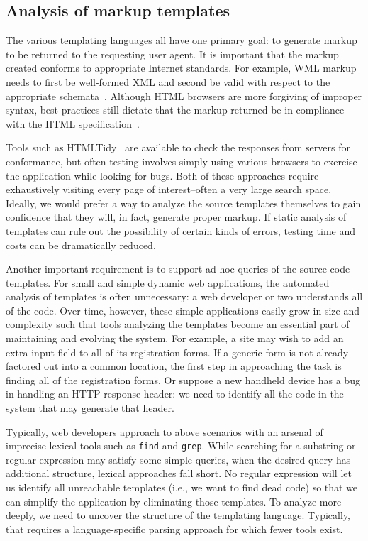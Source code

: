 \documentclass{www2003-submission}
\newcommand{\smtexttt}[1]{{\small\texttt{#1}}}
\begin{document}
\subsection{Analysis of markup templates}

The various templating languages all have one primary goal: to
generate markup to be returned to the requesting user agent.  It is
important that the markup created conforms to appropriate Internet
standards.  For example, WML markup needs to first be well-formed XML
and second be valid with respect to the appropriate
schemata~\cite{WML}.  Although HTML browsers are more forgiving of
improper syntax, best-practices still dictate that the markup returned
be in compliance with the HTML specification~\cite{HTML}.  

Tools such as HTMLTidy~\cite{HTMLTidy} are available to check the
responses from servers for conformance, but often testing involves
simply using various browsers to exercise the application while
looking for bugs.  Both of these approaches require exhaustively
visiting every page of interest--often a very large search space.
Ideally, we would prefer a way to analyze the source templates
themselves to gain confidence that they will, in fact, generate proper
markup.  If static analysis of templates can rule out the possibility
of certain kinds of errors, testing time and costs can be dramatically
reduced.

Another important requirement is to support ad-hoc queries of
the source code templates. For small and simple dynamic web applications,
the automated analysis of templates is often unnecessary: a web
developer or two understands all of the code.  Over time, however,
these simple applications easily grow in size and complexity such that
tools analyzing the templates become an essential part of maintaining
and evolving the system. For example, a site may wish to add an extra
input field to all of its registration forms.  If a generic form is
not already factored out into a common location, the first step in
approaching the task is finding all of the registration forms.  Or
suppose a new handheld device has a bug in handling an HTTP response
header: we need to identify all the code in the system that may
generate that header.

Typically, web developers approach to above scenarios with an arsenal
of imprecise lexical tools such as \smtexttt{find} and
\smtexttt{grep}.  While searching for a substring or regular
expression may satisfy some simple queries, when the desired query has
additional structure, lexical approaches fall short.  No regular
expression will let us identify all unreachable templates (i.e., we
want to find dead code) so that we can simplify the application by
eliminating those templates.  To analyze more deeply, we need to
uncover the structure of the templating language.  Typically, that
requires a language-specific parsing approach for which fewer tools
exist.
\end{document}
